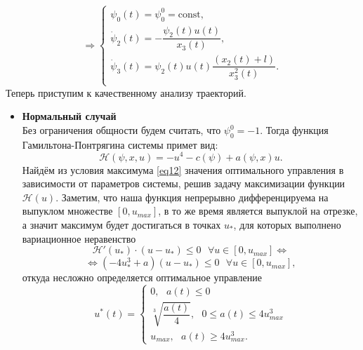 \documentclass[a4paper,12pt]{article}
\begin{document}
$$ \Rightarrow \begin{cases}
	\psi_0(t) = \psi_0^0 = \mathrm{const}, \\
	\dot{\psi}_2(t) = - \dfrac{\psi_{2}(t)u(t)}{x_{3}(t)}, \\
	\dot{\psi}_3(t) = \psi_2(t)u(t) \dfrac{(x_2(t) + l)}{x_3^2(t)}. \\
\end{cases}$$
Теперь приступим к качественному анализу траекторий.
\begin{itemize}
\item \textbf{Нормальный случай} \\
Без ограничения общности будем считать, что $\psi_0^0 = -1$. Тогда функция Гамильтона-Понтрягина системы примет вид:
\[\mathcal{H}(\psi, x, u) = -u^4 - c(\psi) + a(\psi, x)u.\]
Найдём из условия максимума \eqref{eq12} значения оптимального управления в зависимости от параметров системы, решив задачу максимизации функции $\mathcal{H}(u)$. Заметим, что наша функция непрерывно дифференцируема на выпуклом множестве $[0, u_{max}]$, в то же время является выпуклой на отрезке, а значит максимум будет достигаться в точках $u_*$, для которых выполнено вариационное неравенство 
\[ \mathcal{H}'(u_*) \cdot (u - u_*) \leqslant 0 \ \ \ \forall u \in [0, u_{max}] \Leftrightarrow \]
\[ \Leftrightarrow (-4u^3_* + a)(u - u_*) \leqslant 0 \ \ \ \forall u \in [0, u_{max}], \]
откуда несложно определяется оптимальное управление
$$u^*(t) = \begin{cases}
	0, \ \ \ a(t) \leqslant 0 \\
	\sqrt[3]{\dfrac{a(t)}{4}}, \ \ \ 0 \leqslant a(t) \leqslant 4u_{max}^3  \\
	u_{max}, \ \ \ a(t) \geqslant 4u_{max}^3.
\end{cases}$$


\end{itemize}
\end{document}
